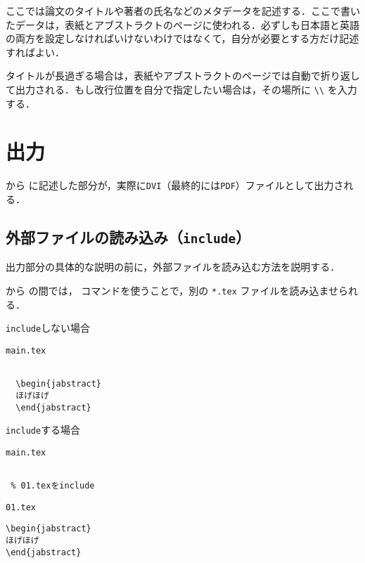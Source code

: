 ここでは論文のタイトルや著者の氏名などのメタデータを記述する．ここで書いたデータは，表紙とアブストラクトのページに使われる．必ずしも日本語と英語の両方を設定しなければいけないわけではなくて，自分が必要とする方だけ記述すればよい．

タイトルが長過ぎる場合は，表紙やアブストラクトのページでは自動で折り返して出力される．もし改行位置を自分で指定したい場合は，その場所に \verb|\\| を入力する．


\section{出力}

\verb|| から \verb|| に記述した部分が，実際に\texttt{DVI}（最終的には\texttt{PDF}）ファイルとして出力される．

\subsection{外部ファイルの読み込み（\texttt{include}）}

出力部分の具体的な説明の前に，外部ファイルを読み込む方法を説明する．

\verb|| から \verb|| の間では，\verb|| コマンドを使うことで，別の \texttt{*.tex} ファイルを読み込ませられる． 

\begin{itembox}[l]{\texttt{include}しない場合}
\begin{itembox}[l]{\texttt{main.tex}}
\begin{verbatim}

  \begin{jabstract}
  ほげほげ
  \end{jabstract}

\end{verbatim}
\end{itembox}
\end{itembox}

\begin{itembox}[l]{\texttt{include}する場合}
\begin{minipage}{0.5\hsize}
\begin{itembox}[l]{\texttt{main.tex}}
\begin{verbatim}

 % 01.texをinclude

\end{verbatim}
\end{itembox}
\end{minipage}
\begin{minipage}{0.5\hsize}
\begin{itembox}[l]{\texttt{01.tex}}
\begin{verbatim}
\begin{jabstract}
ほげほげ
\end{jabstract}
\end{verbatim}
\end{itembox}
\end{minipage}
\end{itembox}

